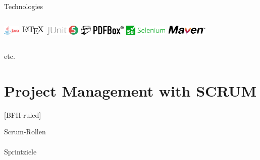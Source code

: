 \documentclass[
    ngerman,%
    authorontitle=true,
]{bfhbeamer}
\begin{document}
\begin{frame}{Technologies}
\begin{columns}
            \begin{column}{0.3\textwidth}
                \includegraphics[height=0.5cm]{pictures/Java-Logo}
                \vspace{1em}
                \includegraphics[height=0.5cm]{pictures/LaTeX_logo}
                \vspace{1em}
                \includegraphics[height=0.5cm]{pictures/JUnit_5_Logo}
                \vspace{1em}
                \includegraphics[height=0.5cm]{pictures/Apache_PDFBox_logo}
                \vspace{1em}
                \includegraphics[height=0.5cm]{pictures/Selenium_logo}
                \vspace{1em}
                \includegraphics[height=0.5cm]{pictures/Apache_Maven_logo}
            \end{column}
        \end{columns}
    \end{frame}

    \begin{frame}{etc.}
        \framesubtitle{}
    \end{frame}

    \section{Project Management with SCRUM}
    [BFH-ruled]
    \frame{\sectionpage}

    \begin{frame}{Scrum-Rollen}
        \framesubtitle{}
    \end{frame}

    \begin{frame}{Sprintziele}
        \framesubtitle{}
    \end{frame}
\end{document}
